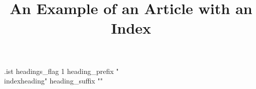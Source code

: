 \begin{filecontents*}{\jobname.ist}
  headings_flag 1
  heading_prefix "\\indexheading{"
  heading_suffix "}"
\end{filecontents*}

\documentclass{article}
\usepackage{imakeidx}
\usepackage[colorlinks,bookmarks]{hyperref}

\newcommand*{\indexheading}[1]{%
  \bigskip\noindent{\large\bfseries\pdfbookmark[1]{#1}{index.#1}#1\par}\nobreak
}
\makeindex[options={-s \jobname.ist}]

\title{An Example of an Article with an Index}


\maketitle

Alligator\index{Alligator}
Bat\index{Bat}
Crocodile\index{Crocodile}
Dingo\index{Dingo}
Elephant\index{Elephant}
Frog\index{Frog}
Giraffe\index{Giraffe}
Horse\index{Horse}
Iguana\index{Iguana}
Jaguar\index{Jaguar}
Kangaroo\index{Kangaroo}
Lemur\index{Lemur}
Mongoose\index{Mongoose}
Newt\index{Newt}
Octopus\index{Octopus}
Penguin\index{Penguin}
Quail\index{Quail}
Rabbit\index{Rabbit}
Snake\index{Snake}
Turtle\index{Turtle}
Unicorn\index{Unicorn}
Velociraptor\index{Velociraptor}
Wildabeest\index{Wildabeest}
Xantus\index{Xantus}
Yak\index{Yak}
Zebra\index{Zebra}

\clearpage
\pdfbookmark[0]{\indexname}{\indexname}
\printindex


